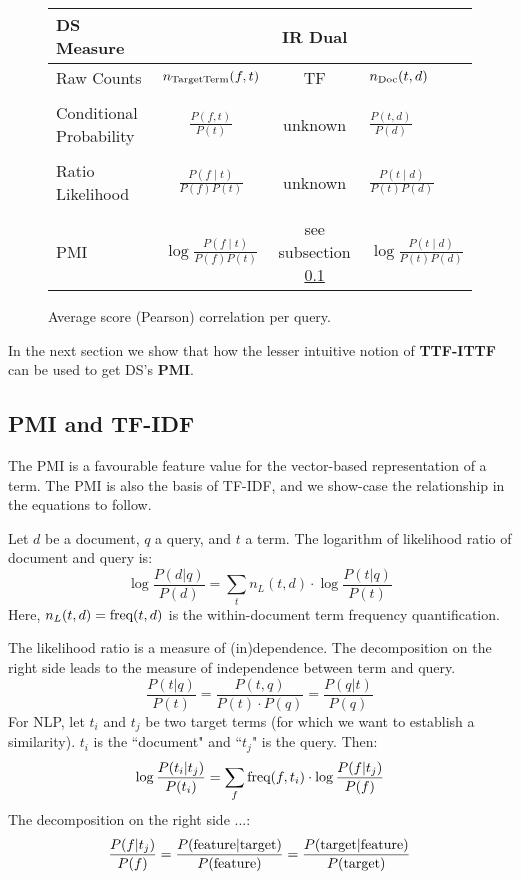  
\begin{figure*}[htb]
  \centering
  \begin{tabular}{|l|c|c|l|}
  \hline
  DS Measure  && IR Dual &\\
  \hline
 Raw Counts  &$n_{\textmd{TargetTerm}}(f,t)$ & TF &$n_{\textmd{Doc}}(t,d)$\\
 &&&\\
 Conditional Probability &$ \frac{P(f,t)}{P(t)}$ & unknown &$\frac{P(t,d)}{P(d)}$\\
 &&&\\
 Ratio Likelihood & $\frac{P(f \mid t)}{P(f)P(t)}$ & unknown & $\frac{P(t \mid d)}{P(t)P(d)}$\\
 &&&\\
 PMI & $\log{\frac{P(f \mid t)}{P(f)P(t)}}$  & see  subsection \ref{PMI-TF-IDF}&$\log{\frac{P(t \mid d)}{P(t)P(d)}}$\\
 \hline
  \end{tabular}
  \caption{Average score (Pearson) correlation per query.}
  \label{tb-ds-ir}
\end{figure*}

  In the next section we show that how the lesser intuitive notion of  {\bf TTF-ITTF} can be used to get DS's {\bf PMI}. 

\subsection{PMI and TF-IDF}
\label{PMI-TF-IDF}

The PMI is a favourable feature value for the vector-based representation
of a term.
The PMI is also the basis of TF-IDF, and we show-case the relationship
in the equations to follow.

Let $d$ be a document, $q$ a query, and $t$ a term.
The logarithm of likelihood ratio of document and query is:
\[
\log\frac{P(d|q)}{P(d)} =
	\sum_t n_L(t,d) \cdot \log\frac{P(t|q)}{P(t)}
\]
Here, $n_L(t,d)=\textmd{freq}(t,d)$ is the within-document term frequency
quantification.

The likelihood ratio is a measure of (in)dependence.
The decomposition on the right side leads to the measure of independence
between term and query.
\[
\frac{P(t|q)}{P(t)} = \frac{P(t,q)}{P(t) \cdot P(q)} = \frac{P(q|t)}{P(q)}
\]
For NLP, let $t_i$ and $t_j$ be two target terms
(for which we want to establish a similarity).
$t_i$ is the ``document" and ``$t_j$" is the query.
Then:
\[
\log\frac{P(t_i|t_j)}{P(t_i)} =
	\sum_f \textmd{freq}(f,t_i) \cdot \log\frac{P(f|t_j)}{P(f)}
\]
The decomposition on the right side ...:
\[
\frac{P(f|t_j)}{P(f)} =
\frac{P(\textmd{feature}|\textmd{target})}{P(\textmd{feature})} =
\frac{P(\textmd{target}|\textmd{feature})}{P(\textmd{target})}
\]

